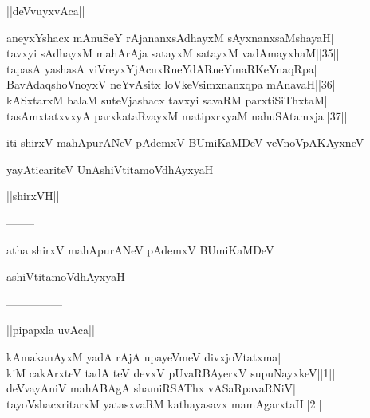 \documentclass{article}
\begin{document}
\begin{center}
||deVvuyxvAca||
\end{center}

aneyxYshacx mAnuSeY rAjananxsAdhayxM sAyxnanxsaMshayaH|\\
tavxyi sAdhayxM mahArAja satayxM satayxM vadAmayxhaM||35||\\
tapasA yashasA viVreyxYjAcnxRneYdARneYmaRKeYnaqRpa|\\
BavAdaqshoVnoyxV neYvAsitx loVkeVsimxnanxqpa mAnavaH||36||\\
kASxtarxM balaM suteVjashacx tavxyi savaRM parxtiSiThxtaM|\\
tasAmxtatxvxyA parxkataRvayxM matipxrxyaM nahuSAtamxja||37||

\begin{center}
iti shirxV mahApurANeV pAdemxV BUmiKaMDeV veVnoVpAKAyxneV
\end{center}

\begin{center}
yayAticariteV UnAshiVtitamoVdhAyxyaH
\end{center}

\begin{center}
||shirxVH||
\end{center}

\begin{center}
--------
\end{center}

\begin{center}
atha shirxV mahApurANeV pAdemxV BUmiKaMDeV
\end{center}

\begin{center}
ashiVtitamoVdhAyxyaH
\end{center}

\begin{center}

---------------
\end{center}

\begin{center}
||pipapxla uvAca||
\end{center}

kAmakanAyxM yadA rAjA upayeVmeV divxjoVtatxma|\\
kiM cakArxteV tadA teV devxV pUvaRBAyerxV supuNayxkeV||1||\\
deVvayAniV mahABAgA shamiRSAThx vASaRpavaRNiV|\\
tayoVshacxritarxM yatasxvaRM kathayasavx mamAgarxtaH||2||\\
\end{document}
